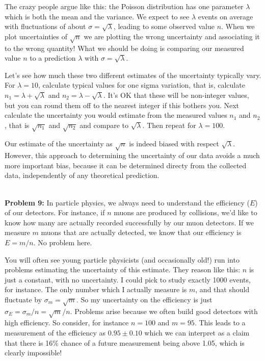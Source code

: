 \documentclass[12pt,oneside]{book}
\begin{document}
The crazy people argue like this: the Poisson distribution has one
parameter $\lambda$ which is both the mean and the variance.  We
expect to see $\lambda$ events on average with fluctuations of about
$\sigma = \sqrt{\lambda}$, leading to some observed value $n$.  When
we plot uncertainties of $\sqrt{n}$ we are plotting the wrong
uncertainty and associating it to the wrong quantity!  What we should
be doing is comparing our measured value $n$ to a prediction $\lambda$
with  $\sigma = \sqrt{\lambda}$.

Let's see how much these two different estimates of the uncertainty
typically vary.  For $\lambda=10$, calculate typical values for one
sigma variation, that is, calculate $n_1 = \lambda + \sqrt{\lambda}$
and $n_2 = \lambda - \sqrt{\lambda}$.  It's OK that these will be
non-integer values, but you can round them off to the nearest integer
if this bothers you.  Next calculate the uncertainty you would
estimate from the measured values $n_1$ and $n_2$, that is
$\sqrt{n_1}$ and $\sqrt{n_2}$ and compare to $\sqrt{\lambda}$.  Then
repeat for $\lambda = 100$.

Our estimate of the uncertainty as $\sqrt{n}$ is indeed biased with
respect $\sqrt{\lambda}$.  However, this approach to determining the
uncertainty of our data avoids a much more important bias, because it
can be determined directy from the collected data, independently of
any theoretical prediction. \\ \\ \vskip 0.25cm

\noindent
{\bf Problem 9:}  In particle physics, we always need to understand the efficiency ($E$) of our detectors.  For instance, if $n$ muons are produced by collisions, we'd like to know how many are actually recorded successfully by our muon detectors.  If we measure $m$ muons that are actually detected, we know that our efficiency is $E = m/n$.  No problem here.

You will often see young particle physicists (and occasionally old!)
run into problems estimating the uncertainty of this estimate.  They
reason like this: $n$ is just a constant, with no uncertainty.  I
could pick to study exactly 1000 events, for instance.  The only
number which I actually measure is $m$, and that should fluctuate by
$\sigma_m = \sqrt{m}$.  So my uncertainty on the efficiency is just
$\sigma_E= \sigma_m/n = \sqrt{m}/n$.  Problems arise because we often
build good detectors with high efficiency.  So consider, for instance
$n=100$ and $m=95$.  This leads to a measurement of the efficiency as
$0.95 \pm 0.10$ which we can interpret as a claim that there is 16\%
chance of a future measurement being above 1.05, which is clearly impossible!
\end{document}
